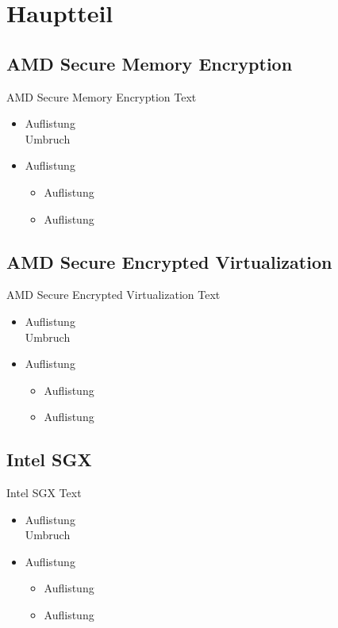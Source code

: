 \documentclass{sdqbeamer}
\begin{document}
\section{Hauptteil}

\subsection{AMD Secure Memory Encryption}
\begin{frame}{AMD Secure Memory Encryption}
	Text
	\begin{itemize}
		\item Auflistung\\ Umbruch
		\item Auflistung
		\begin{itemize}
			\item Auflistung
			\item Auflistung
		\end{itemize}
	\end{itemize}
\end{frame}

\subsection{AMD Secure Encrypted Virtualization}
\begin{frame}{AMD Secure Encrypted Virtualization}
	Text
	\begin{itemize}
		\item Auflistung\\ Umbruch
		\item Auflistung
		\begin{itemize}
			\item Auflistung
			\item Auflistung
		\end{itemize}
	\end{itemize}
\end{frame}

\subsection{Intel SGX}
\begin{frame}{Intel SGX}
	Text
	\begin{itemize}
		\item Auflistung\\ Umbruch
		\item Auflistung
		\begin{itemize}
			\item Auflistung
			\item Auflistung
		\end{itemize}
	\end{itemize}
\end{frame}
\end{document}
